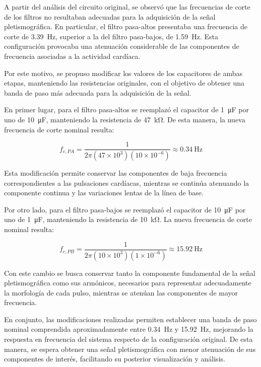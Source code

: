 \documentclass[10pt]{article}
\begin{document}
A partir del análisis del circuito original, se observó que las frecuencias de corte de los filtros no resultaban adecuadas para la adquisición de la señal pletismográfica. En particular, el filtro pasa-altos presentaba una frecuencia de corte de \SI{3.39}{\hertz}, superior a la del filtro pasa-bajos, de \SI{1.59}{\hertz}. Esta configuración provocaba una atenuación considerable de las componentes de frecuencia asociadas a la actividad cardíaca.

Por este motivo, se propuso modificar los valores de los capacitores de ambas etapas, manteniendo las resistencias originales, con el objetivo de obtener una banda de paso más adecuada para la adquisición de la señal.

En primer lugar, para el filtro pasa-altos se reemplazó el capacitor de \SI{1}{\micro\farad} por uno de \SI{10}{\micro\farad}, manteniendo la resistencia de \SI{47}{\kilo\ohm}. De esta manera, la nueva frecuencia de corte nominal resulta:

\begin{equation}
    f_{c,PA} =
    \frac{1}{2\pi(47\times10^3)(10\times10^{-6})}
    \approx \SI{0.34}{\hertz}
\end{equation}

Esta modificación permite conservar las componentes de baja frecuencia correspondientes a las pulsaciones cardíacas, mientras se continúa atenuando la componente continua y las variaciones lentas de la línea de base.

Por otro lado, para el filtro pasa-bajos se reemplazó el capacitor de \SI{10}{\micro\farad} por uno de \SI{1}{\micro\farad}, manteniendo la resistencia de \SI{10}{\kilo\ohm}. La nueva frecuencia de corte nominal resulta:

\begin{equation}
    f_{c,PB} =
    \frac{1}{2\pi(10\times10^3)(1\times10^{-6})}
    \approx \SI{15.92}{\hertz}
\end{equation}

Con este cambio se busca conservar tanto la componente fundamental de la señal pletismográfica como sus armónicos, necesarios para representar adecuadamente la morfología de cada pulso, mientras se atenúan las componentes de mayor frecuencia.

En conjunto, las modificaciones realizadas permiten establecer una banda de paso nominal comprendida aproximadamente entre \SI{0.34}{\hertz} y \SI{15.92}{\hertz}, mejorando la respuesta en frecuencia del sistema respecto de la configuración original. De esta manera, se espera obtener una señal pletismográfica con menor atenuación de sus componentes de interés, facilitando su posterior visualización y análisis.
\end{document}
